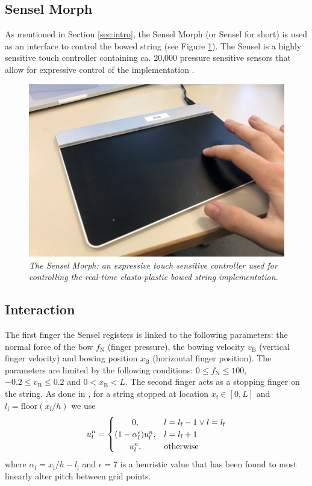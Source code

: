 \documentclass[twoside,a4paper,dvipsnames]{article}
\begin{document}
\subsection{Sensel Morph}
As mentioned in Section \ref{sec:intro}, the Sensel Morph (or Sensel for short) is used as an interface to control the bowed string (see Figure \ref{fig:sensel}). The Sensel is a highly sensitive touch controller containing ca. 20,000 pressure sensitive sensors that allow for expressive control of the implementation \cite{Sensel2019}.
\begin{figure}[ht]
\centerline{\includegraphics[width=1.0\columnwidth]{IMG_0637.jpg}}
\caption{\label{fig:sensel}{\it The Sensel Morph: an expressive touch sensitive controller used for controlling the real-time elasto-plastic bowed string implementation.}}
\end{figure}

\subsection{Interaction}
The first finger the Sensel registers is linked to the following parameters: the normal force of the bow $f_\text{N}$ (finger pressure), the bowing velocity $v_\text{B}$ (vertical finger velocity) and bowing position $x_\text{B}$ (horizontal finger position). The parameters are limited by the following conditions: $0 \leq f_\text{N} \leq 100$, $-0.2 \leq v_\text{B} \leq 0.2$ and $0<x_\text{B}<L$. The second finger acts as a stopping finger on the string. As done in \cite{Willemsen2019}, for a string stopped at location $x_\text{f}\in[0,L]$ and $l_\text{f}=\text{floor}(x_\text{f}/h)$ we use
\begin{equation}
u_l^n = 
    \begin{cases}
        \hfil 0, & l = l_\text{f} - 1 \vee l = l_\text{f}\\
        \hfil (1-\alpha_\text{f}^\epsilon) u_l^n, & l = l_\text{f} + 1\\
        \hfil u_l^n, & \text{otherwise}
    \end{cases}
\end{equation}
where $\alpha_\text{f} = x_\text{f} / h - l_\text{f}$ and $\epsilon = 7$ is a heuristic value that has been found to most linearly alter pitch between grid points. 
\end{document}
